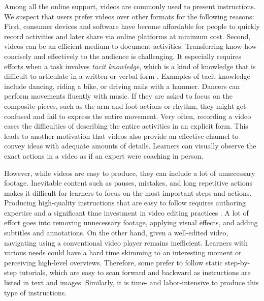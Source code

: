 Among all the online support, videos are commonly used to present instructions. We suspect that users prefer videos over other formats for the following reasons:
%
First, consumer devices and software have become affordable for people to quickly record activities and later share via online platforms at minimum cost.
%
Second, videos can be an efficient medium to document activities. Transferring know-how concisely and effectively to the audience is challenging. It especially requires efforts when a task involves \emph{tacit knowledge}, which is a kind of knowledge that is difficult to articulate in a written or verbal form \cite{polanyi1958personal, Klemmer:2006:BMF:1142405.1142429}. Examples of tacit knowledge include dancing, riding a bike, or driving nails with a hammer. Dancers can perform movements fluently with music. If they are asked to focus on the composite pieces, such as the arm and foot actions or rhythm, they might get confused and fail to express the entire movement. Very often, recording a video eases the difficulties of describing the entire activities in an explicit form.
%
This leads to another motivation that videos also provide an effective channel to convey ideas with adequate amounts of details. Learners can visually observe the exact actions in a video as if an expert were coaching in person.

However, while videos are easy to produce, they can include a lot of unnecessary footage. Inevitable content such as pauses, mistakes, and long repetitive actions makes it difficult for learners to focus on the most important steps and actions. Producing high-quality instructions that are easy to follow requires authoring expertise and a significant time investment in video editing practices \cite{Muller:2009tw}. A lot of effort goes into removing unnecessary footage, applying visual effects, and adding subtitles and annotations. On the other hand, given a well-edited video, navigating using a conventional video player remains inefficient. Learners with various needs could have a hard time skimming to an interesting moment or perceiving high-level overviews. Therefore, some prefer to follow static step-by-step tutorials, which are easy to scan forward and backward as instructions are listed in text and images. Similarly, it is time- and labor-intensive to produce this type of instructions.

